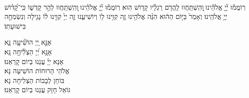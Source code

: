 \documentclass[twoside, openany, parskip=half, 11pt]{book}
\begin{document}
\\
רֽוֹמֲמ֡וּ יְ֘יָ֤ אֱלֹהֵ֗ינוּ ֖וְהִֽשְׁתַּֽחֲווּ לַֽהֲדֹ֥ם רַגְלָ֗יו קָד֥וֹשׁ הֽוּא׃
רֽוֹמֲמ֡וּ יְ֘יָ֤ אֱלֹהֵ֗ינוּ ֖וְהִֽשְׁתַּֽחֲווּ לְהַ֣ר קָדְשׁ֑וֹ כִּֽי־קָ֝ד֗וֹשׁ יְיָ֥ אֱלֹהֵֽינוּ׃
וְאָמַר֙ בַּיּ֣וֹם הַה֔וּא הִנֵּ֨ה אֱלֹהֵ֥ינוּ זֶ֛ה קִוִּ֥ינוּ ל֖וֹ וְיוֹשִׁיעֵ֑נוּ זֶ֤ה יְיָ֙ קִוִּ֣ינוּ ל֔וֹ נָגִ֥ילָה וְנִשְׂמְחָ֖ה בִּישׁוּעָתֽוֹ׃



אָנָּ֣א יְ֭יָ הוֹשִׁ֘יעָ֥ה נָּ֑א\\
אָנָּ֥א יְ֝יָ הַצְלִ֘יחָ֥ה נָּֽא׃\\
אָנָּא יְיָ֗ עֲנֵנוּ בְיוֹם קׇרְאֵנוּ׃\\

אֱלֹהֵי הָרוּחוֹת הוֹשִׁיעָה נָּא׃\\ בּוֹחֵן לְבָבוֹת הַצְלִיחָה נָא׃\\ גּוֹאֵל חָזָק עֲנֵנוּ בְיוֹם קׇרְאֵנוּ׃


\end{document}
